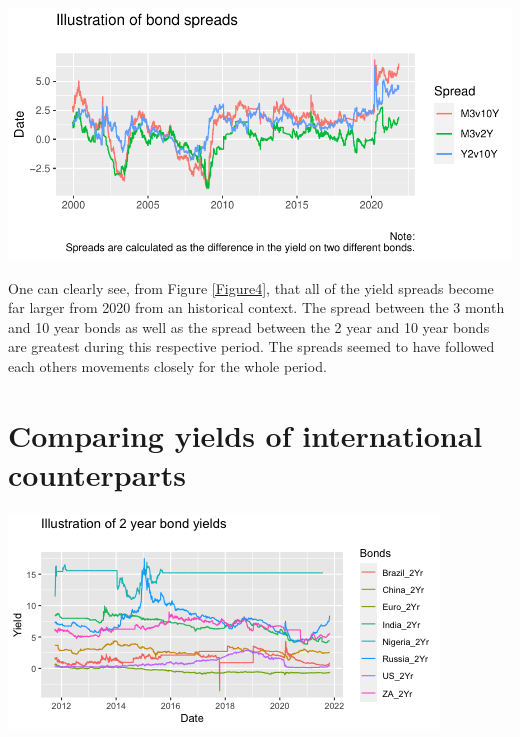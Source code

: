 \documentclass[11pt,preprint, authoryear]{elsarticle}
\let\origfigure\figure
\let\endorigfigure\endfigure
\renewenvironment{figure}[1][2] {
    \expandafter\origfigure\expandafter[H]
} {
    \endorigfigure
}
\numberwithin{equation}{section}
\numberwithin{figure}{section}
\numberwithin{table}{section}
\begin{document}
\begin{figure}[H]

{\centering \includegraphics{Question2_files/figure-latex/Figure4-1} 

}

\caption{Caption Here \label{Figure4}}\label{fig:Figure4}
\end{figure}

One can clearly see, from Figure \ref{Figure4}, that all of the yield
spreads become far larger from 2020 from an historical context. The
spread between the 3 month and 10 year bonds as well as the spread
between the 2 year and 10 year bonds are greatest during this respective
period. The spreads seemed to have followed each others movements
closely for the whole period.

\hypertarget{comparing-yields-of-international-counterparts}{%
\section{\texorpdfstring{Comparing yields of international counterparts
\label{International}}{Comparing yields of international counterparts }}\label{comparing-yields-of-international-counterparts}}

\begin{figure}[H]

{\centering \includegraphics{Question2_files/figure-latex/Figure5-1} 

}

\caption{Caption Here \label{Figure5}}\label{fig:Figure5}
\end{figure}
\end{document}

